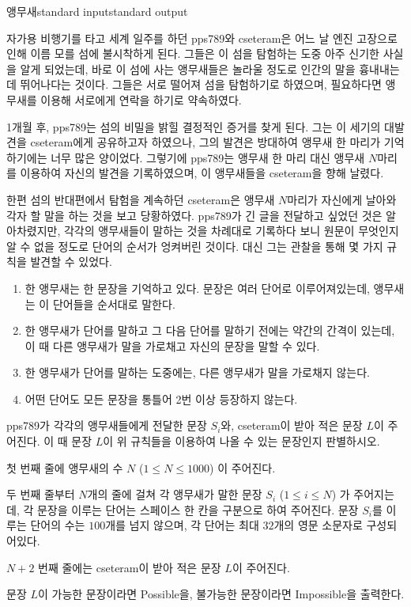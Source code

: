 \begin{problem}{앵무새}{standard input}{standard output}

자가용 비행기를 타고 세계 일주를 하던 pps789와 cseteram은 어느 날 엔진 고장으로 인해 이름 모를 섬에 불시착하게 된다. 그들은 이 섬을 탐험하는 도중 아주 신기한 사실을 알게 되었는데, 바로 이 섬에 사는 앵무새들은 놀라울 정도로 인간의 말을 흉내내는 데 뛰어나다는 것이다. 그들은 서로 떨어져 섬을 탐험하기로 하였으며, 필요하다면 앵무새를 이용해 서로에게 연락을 하기로 약속하였다.

1개월 후, pps789는 섬의 비밀을 밝힐 결정적인 증거를 찾게 된다. 그는 이 세기의 대발견을 cseteram에게 공유하고자 하였으나, 그의 발견은 방대하여 앵무새 한 마리가 기억하기에는 너무 많은 양이었다. 그렇기에 pps789는 앵무새 한 마리 대신 앵무새 $N$마리를 이용하여 자신의 발견을 기록하였으며, 이 앵무새들을 cseteram을 향해 날렸다.

한편 섬의 반대편에서 탐험을 계속하던 cseteram은 앵무새 $N$마리가 자신에게 날아와 각자 할 말을 하는 것을 보고 당황하였다. pps789가 긴 글을 전달하고 싶었던 것은 알아차렸지만, 각각의 앵무새들이 말하는 것을 차례대로 기록하다 보니 원문이 무엇인지 알 수 없을 정도로 단어의 순서가 엉켜버린 것이다. 대신 그는 관찰을 통해 몇 가지 규칙을 발견할 수 있었다.

\begin{enumerate}
\item{한 앵무새는 한 문장을 기억하고 있다. 문장은 여러 단어로 이루어져있는데, 앵무새는 이 단어들을 순서대로 말한다.}
\item{한 앵무새가 단어를 말하고 그 다음 단어를 말하기 전에는 약간의 간격이 있는데, 이 때 다른 앵무새가 말을 가로채고 자신의 문장을 말할 수 있다.}
\item{한 앵무새가 단어를 말하는 도중에는, 다른 앵무새가 말을 가로채지 않는다.}
\item{어떤 단어도 모든 문장을 통틀어 2번 이상 등장하지 않는다.}
\end{enumerate}

pps789가 각각의 앵무새들에게 전달한 문장 $S_i$와, cseteram이 받아 적은 문장 $L$이 주어진다. 이 때 문장 $L$이 위 규칙들을 이용하여 나올 수 있는 문장인지 판별하시오.

\InputFile
첫 번째 줄에 앵무새의 수 $N$ ($1 \le N \le 1000$) 이 주어진다.

두 번째 줄부터 $N$개의 줄에 걸쳐 각 앵무새가 말한 문장 $S_i$ ($1 \le i \le N$) 가 주어지는데, 각 문장을 이루는 단어는 스페이스 한 칸을 구분으로 하여 주어진다. 문장 $S_i$를 이루는 단어의 수는 $100$개를 넘지 않으며, 각 단어는 최대 $32$개의 영문 소문자로 구성되어있다.

$N+2$ 번째 줄에는 cseteram이 받아 적은 문장 $L$이 주어진다.

\OutputFile
문장 $L$이 가능한 문장이라면 Possible을, 불가능한 문장이라면 Impossible을 출력한다.

\Example

\begin{example}
%
%
%
\end{example}

\end{problem}
